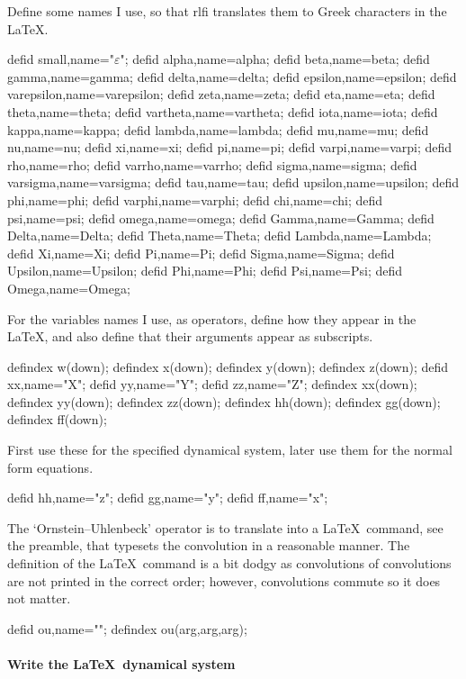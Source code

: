 \documentclass[11pt,a5paper]{article}
\def\ou\big(#1,#2,#3\big)%
\def\eps{\ensuremath{\varepsilon}}
\begin{document}
Define some names I use, so that rlfi translates them to
Greek characters in the \LaTeX.
\begin{reduce}
defid small,name="\eps";%
defid alpha,name=alpha;
defid beta,name=beta;
defid gamma,name=gamma;
defid delta,name=delta;
defid epsilon,name=epsilon;
defid varepsilon,name=varepsilon;
defid zeta,name=zeta;
defid eta,name=eta;
defid theta,name=theta;
defid vartheta,name=vartheta;
defid iota,name=iota;
defid kappa,name=kappa;
defid lambda,name=lambda;
defid mu,name=mu;
defid nu,name=nu;
defid xi,name=xi;
defid pi,name=pi;
defid varpi,name=varpi;
defid rho,name=rho;
defid varrho,name=varrho;
defid sigma,name=sigma;
defid varsigma,name=varsigma;
defid tau,name=tau;
defid upsilon,name=upsilon;
defid phi,name=phi;
defid varphi,name=varphi;
defid chi,name=chi;
defid psi,name=psi;
defid omega,name=omega;
defid Gamma,name=Gamma;
defid Delta,name=Delta;
defid Theta,name=Theta;
defid Lambda,name=Lambda;
defid Xi,name=Xi;
defid Pi,name=Pi;
defid Sigma,name=Sigma;
defid Upsilon,name=Upsilon;
defid Phi,name=Phi;
defid Psi,name=Psi;
defid Omega,name=Omega;
\end{reduce}

For the variables names I use, as operators, define how they
appear in the \LaTeX, and also define that their arguments
appear as subscripts.
\begin{reduce}
defindex w(down);
defindex x(down);
defindex y(down);
defindex z(down);
defid xx,name="X";
defid yy,name="Y";
defid zz,name="Z";
defindex xx(down);
defindex yy(down);
defindex zz(down);
defindex hh(down);
defindex gg(down);
defindex ff(down);
\end{reduce}

First use these for the specified dynamical system, later
use them for the normal form equations.
\begin{reduce}
defid hh,name="\dot z";
defid gg,name="\dot y";
defid ff,name="\dot x";
\end{reduce}

The `Ornstein--Uhlenbeck' operator is to translate into a
\LaTeX\ command, see the preamble, that typesets the
convolution in a reasonable manner. The definition of the
\LaTeX\ command is a bit dodgy as convolutions of
convolutions are not printed in the correct order; however, 
convolutions commute so it does not matter.
\begin{reduce}
defid ou,name="\ou";
defindex ou(arg,arg,arg);
\end{reduce}


\paragraph{Write the \LaTeX\ dynamical system}
\end{document}
